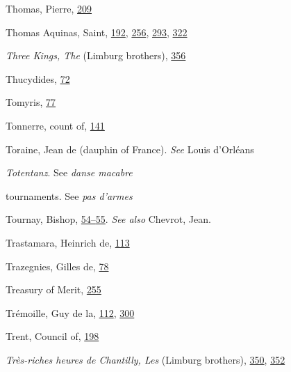 Thomas, Pierre,
\protect\hyperlink{14_Chapter_Seven__THE_PIOUS_PERSONA.xhtmlux5cux23page_209}{209}

Thomas Aquinas, Saint,
\protect\hyperlink{13_Chapter_Six__THE_DEPICTION_OF_TH.xhtmlux5cux23page_192}{192},
\protect\hyperlink{17_Chapter_Ten__THE_FAILURE_OF_IMAG.xhtmlux5cux23page_256}{256},
\protect\hyperlink{18_Chapter_Eleven__THE_FORMS_OF_THO.xhtmlux5cux23page_293}{293},
\protect\hyperlink{20_ILLUSTRATIONS_FOLLOW_PAGE.xhtmlux5cux23page_322}{322}

\emph{Three Kings, The} (Limburg brothers),
\protect\hyperlink{21_Chapter_Thirteen__IMAGE_AND_WORD.xhtmlux5cux23page_356}{356}

Thucydides,
\protect\hyperlink{10_Chapter_Three__THE_HEROIC_DREAM.xhtmlux5cux23page_72}{72}

Tomyris,
\protect\hyperlink{10_Chapter_Three__THE_HEROIC_DREAM.xhtmlux5cux23page_77}{77}

Tonnerre, count of,
\protect\hyperlink{11_Chapter_Four__THE_FORMS_OF_LOVE.xhtmlux5cux23page_141}{141}

Toraine, Jean de (dauphin of France). \emph{See} Louis d'Orléans

\emph{Totentanz}. See \emph{danse macabre}

tournaments. See \emph{pas d'armes}

\protect\hypertarget{25_INDEX.xhtmlux5cux23page_466}{}{}Tournay, Bishop,
\protect\hyperlink{09_Chapter_Two__THE_CRAVING_FOR_A_M.xhtmlux5cux23page_54}{54--}\protect\hyperlink{09_Chapter_Two__THE_CRAVING_FOR_A_M.xhtmlux5cux23page_55}{55}.
\emph{See also} Chevrot, Jean.

Trastamara, Heinrich de,
\protect\hyperlink{10_Chapter_Three__THE_HEROIC_DREAM.xhtmlux5cux23page_113}{113}

Trazegnies, Gilles de,
\protect\hyperlink{10_Chapter_Three__THE_HEROIC_DREAM.xhtmlux5cux23page_78}{78}

Treasury of Merit,
\protect\hyperlink{17_Chapter_Ten__THE_FAILURE_OF_IMAG.xhtmlux5cux23page_255}{255}

Trémoille, Guy de la,
\protect\hyperlink{10_Chapter_Three__THE_HEROIC_DREAM.xhtmlux5cux23page_112}{112},
\protect\hyperlink{20_ILLUSTRATIONS_FOLLOW_PAGE.xhtmlux5cux23page_300}{300}

Trent, Council of,
\protect\hyperlink{13_Chapter_Six__THE_DEPICTION_OF_TH.xhtmlux5cux23page_198}{198}

\emph{Très-riches heures de Chantilly, Les} (Limburg brothers),
\protect\hyperlink{21_Chapter_Thirteen__IMAGE_AND_WORD.xhtmlux5cux23page_350}{350},
\protect\hyperlink{21_Chapter_Thirteen__IMAGE_AND_WORD.xhtmlux5cux23page_352}{352}

